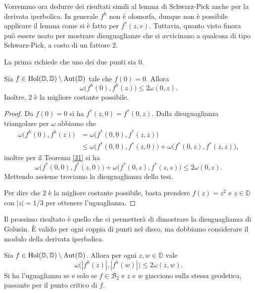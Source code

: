 Vorremmo ora dedurre dei risultati simili al lemma di Schwarz-Pick anche per la derivata iperbolica. In generale $f^h$ non è olomorfa, dunque non è possibile applicare il lemma come si è fatto per $f^*(z,v)$. Tuttavia, quanto visto finora può essere usato per mostrare disuguaglianze che si avvicinano a qualcosa di tipo Schwarz-Pick, a costo di un fattore $2$.

La prima richiede che uno dei due punti sia $0$.

\begin{cor} \label{36}
  Sia $f \in \text{\normalfont{Hol}}(\mathbb{D},\mathbb{D})\setminus\text{\normalfont{Aut}}(\mathbb{D})$ tale che $f(0)=0$. Allora
  \begin{equation}
    \omega\bigl(f^h(0),f^h(z)\bigr) \le 2\omega(0,z).
  \end{equation}
  Inoltre, $2$ è la migliore costante possibile.
\end{cor}

\begin{proof}
  Da $f(0)=0$ si ha $f^*(z,0)=f^*(0,z)$. Dalla disuguaglianza triangolare per $\omega$ abbiamo che
  \begin{align*}
    \omega\bigl(f^h(0),f^h(z)\bigr) & = \omega\bigl(f^*(0,0),f^*(z,z)\bigr) \\
    & \le \omega\bigl(f^*(0,0),f^*(z,0)\bigr)+\omega\bigl(f^*(0,z),f^*(z,z)\bigr),
  \end{align*}
  inoltre per il Teorema \ref{31} si ha
  $$\omega\bigl(f^*(0,0),f^*(z,0)\bigr)+\omega\bigl(f^*(0,z),f^*(z,z)\bigr)\le 2\omega(0,z).$$
  Mettendo assieme troviamo la disuguaglianza della tesi.

  Per dire che $2$ è la migliore costante possibile, basta prendere $f(z)=z^2$ e $z \in \mathbb{D}$ con $|z|=1/3$ per ottenere l'uguaglianza.
\end{proof}

Il prossimo risultato è quello che ci permetterà di dimostrare la disuguaglianza di Golusin. È valido per ogni coppia di punti nel disco, ma dobbiamo considerare il modulo della derivata iperbolica.

\begin{cor} \label{quasigolusin}
  Sia $f \in \text{\normalfont{Hol}}(\mathbb{D},\mathbb{D})\setminus\text{\normalfont{Aut}}(\mathbb{D})$. Allora per ogni $z, w \in \mathbb{D}$ vale
  \begin{equation} \label{quasigol}
    \omega\bigl(|f^h(z)|, |f^h(w)|\bigr) \le 2\omega(z,w).
  \end{equation}
  Si ha l'uguaglianza se e solo se $f \in \mathcal{B}_2$ e $z$ e $w$ giacciono sulla stessa geodetica, passante per il punto critico di $f$.
\end{cor}

